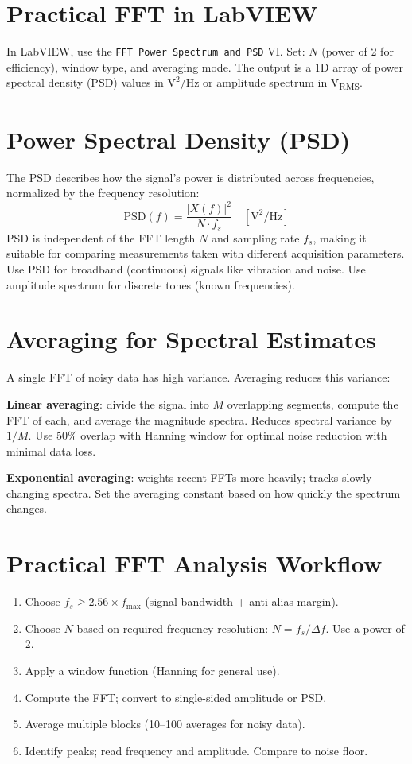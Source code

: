 \documentclass[11pt,letterpaper,twoside,openany]{book}
\begin{document}
\section{Practical FFT in LabVIEW}
In LabVIEW, use the \texttt{FFT Power Spectrum and PSD} VI. Set: $N$ (power of 2 for efficiency), window type, and averaging mode. The output is a 1D array of power spectral density (PSD) values in $\text{V}^2/\text{Hz}$ or amplitude spectrum in V\textsubscript{RMS}.


\section{Power Spectral Density (PSD)}
The PSD describes how the signal's power is distributed across frequencies, normalized by the frequency resolution:
\begin{equation}
\text{PSD}(f) = \frac{|X(f)|^2}{N \cdot f_s} \quad [\text{V}^2/\text{Hz}]
\end{equation}
PSD is independent of the FFT length $N$ and sampling rate $f_s$, making it suitable for comparing measurements taken with different acquisition parameters. Use PSD for broadband (continuous) signals like vibration and noise. Use amplitude spectrum for discrete tones (known frequencies).

\section{Averaging for Spectral Estimates}
A single FFT of noisy data has high variance. Averaging reduces this variance:

\textbf{Linear averaging}: divide the signal into $M$ overlapping segments, compute the FFT of each, and average the magnitude spectra. Reduces spectral variance by $1/M$. Use 50\% overlap with Hanning window for optimal noise reduction with minimal data loss.

\textbf{Exponential averaging}: weights recent FFTs more heavily; tracks slowly changing spectra. Set the averaging constant based on how quickly the spectrum changes.

\section{Practical FFT Analysis Workflow}
\begin{enumerate}[leftmargin=1.5em]
\item Choose $f_s \geq 2.56 \times f_{\max}$ (signal bandwidth + anti-alias margin).
\item Choose $N$ based on required frequency resolution: $N = f_s / \Delta f$. Use a power of 2.
\item Apply a window function (Hanning for general use).
\item Compute the FFT; convert to single-sided amplitude or PSD.
\item Average multiple blocks (10--100 averages for noisy data).
\item Identify peaks; read frequency and amplitude. Compare to noise floor.
\end{enumerate}
\end{document}
